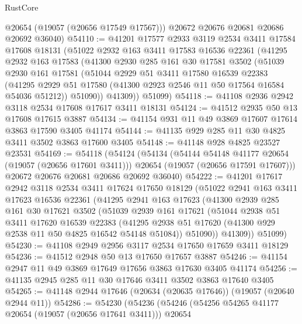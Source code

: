 \begin{lexlean}{RustCore}
\begin{coremodule}
        @20654
        (@19057 (@20656 @17549 @17567)))
      @20672
      @20676
      @20681
      @20686
      @20692
      @36040)
@54110 := @41201
    @17577
    @2933
    @3119
    @2534
    @3411
    @17584
    @17608
    @18131
    (@51022
      @2932
      @163
      @3411
      @17583
      @16536
      @22361
      (@41295
        @2932
        @163
        @17583
        (@41300
          @2930
          @285
          @161
          @30
          @17581
          @3502
          (@51039
            @2930
            @161
            @17581
            (@51044
              @2929
              @51
              @3411
              @17580
              @16539
              @22383
              (@41295 @2929 @51 @17580 (@41300 @2923 @2546 @11 @50 @17564 @16584 @54036 @51212))
              @51090))
          @41309))
      @51099)
@54118 := @41108 @2936 @2942 @3118 @2534 @17608 @17617 @3411 @18131
@54124 := @41512 @2935 @50 @13 @17608 @17615 @3887
@54134 := @41154 @931 @11 @49 @3869 @17607 @17614 @3863 @17590 @3405 @41174
@54144 := @41135 @929 @285 @11 @30 @4825 @3411 @3502 @3863 @17600 @3405
@54148 := @41148 @928 @4825 @23527 @23531
@54169 := @54118
    (@54124
      (@54134
        (@54144 @54148 @41177 @20654 (@19057 (@20656 @17601 @3411)))
        @20654
        (@19057 (@20656 @17591 @17607)))
      @20672
      @20676
      @20681
      @20686
      @20692
      @36040)
@54222 := @41201
    @17617
    @2942
    @3118
    @2534
    @3411
    @17624
    @17650
    @18129
    (@51022
      @2941
      @163
      @3411
      @17623
      @16536
      @22361
      (@41295
        @2941
        @163
        @17623
        (@41300
          @2939
          @285
          @161
          @30
          @17621
          @3502
          (@51039
            @2939
            @161
            @17621
            (@51044
              @2938
              @51
              @3411
              @17620
              @16539
              @22383
              (@41295 @2938 @51 @17620 (@41300 @929 @2538 @11 @50 @4825 @16542 @54148 @51084))
              @51090))
          @41309))
      @51099)
@54230 := @41108 @2949 @2956 @3117 @2534 @17650 @17659 @3411 @18129
@54236 := @41512 @2948 @50 @13 @17650 @17657 @3887
@54246 := @41154 @2947 @11 @49 @3869 @17649 @17656 @3863 @17630 @3405 @41174
@54256 := @41135 @2945 @285 @11 @30 @17646 @3411 @3502 @3863 @17640 @3405
@54265 := @41148 @2944 @17646 (@20634 (@20635 @17646)) (@19057 (@20640 @2944 @11))
@54286 := @54230
    (@54236
      (@54246
        (@54256 @54265 @41177 @20654 (@19057 (@20656 @17641 @3411)))
        @20654

\end{coremodule}
\end{lexlean}
